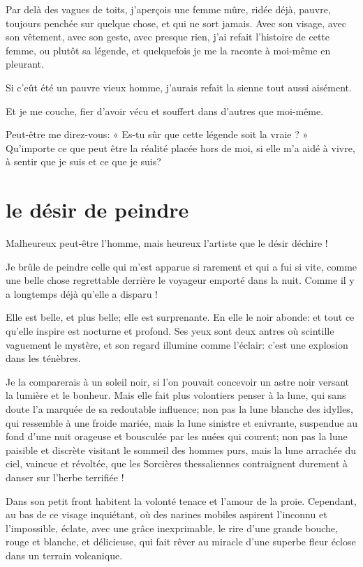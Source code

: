 Par delà des vagues de toits, j’aperçois une femme
mûre, ridée déjà, pauvre, toujours penchée sur quelque chose, et qui ne
sort jamais. Avec son visage, avec son vêtement, avec son geste, avec
presque rien, j’ai refait l’histoire
de cette femme, ou plutôt sa légende, et quelquefois je me la raconte à
moi{}-même en pleurant.

Si c’eût été un pauvre vieux homme,
j’aurais refait la sienne tout aussi aisément.

Et je me couche, fier d’avoir vécu et souffert dans
d’autres que moi{}-même.

Peut{}-être me direz{}-vous: « Es{}-tu sûr que cette légende soit la
vraie ? » Qu’importe ce que peut être la réalité
placée hors de moi, si elle m’a aidé à vivre, à sentir
que je suis et ce que je suis?

\quebra\section[Le désir de peindre]{le désir de peindre}

Malheureux peut{}-être l’homme, mais heureux
l’artiste que le désir déchire !

Je brûle de peindre celle qui m’est apparue si rarement
et qui a fui si vite, comme une belle chose regrettable derrière le
voyageur emporté dans la nuit. Comme il y a longtemps déjà
qu’elle a disparu !

Elle est belle, et plus belle; elle est surprenante. En elle le noir
abonde: et tout ce qu’elle inspire est nocturne et
profond. Ses yeux sont deux antres où scintille vaguement le mystère,
et son regard illumine comme l’éclair:
c’est une explosion dans les ténèbres.

Je la comparerais à un soleil noir, si l’on pouvait
concevoir un astre noir versant la lumière et le bonheur. Mais elle
fait plus volontiers penser à la lune, qui sans doute
l’a marquée de sa redoutable influence; non pas la
lune blanche des idylles, qui ressemble à une froide mariée, mais la
lune sinistre et enivrante, suspendue au fond d’une
nuit orageuse et bousculée par les nuées qui courent; non pas la lune
paisible et discrète visitant le sommeil des hommes purs, mais la lune
arrachée du ciel, vaincue et révoltée, que les Sorcières thessaliennes
contraignent durement à danser sur l’herbe terrifiée !

Dans son petit front habitent la volonté tenace et
l’amour de la proie. Cependant, au bas de ce visage
inquiétant, où des narines mobiles aspirent l’inconnu
et l’impossible, éclate, avec une grâce inexprimable,
le rire d’une grande bouche, rouge et blanche, et
délicieuse, qui fait rêver au miracle d’une superbe
fleur éclose dans un terrain volcanique.

